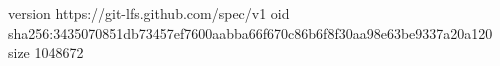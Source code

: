 version https://git-lfs.github.com/spec/v1
oid sha256:3435070851db73457ef7600aabba66f670c86b6f8f30aa98e63be9337a20a120
size 1048672
